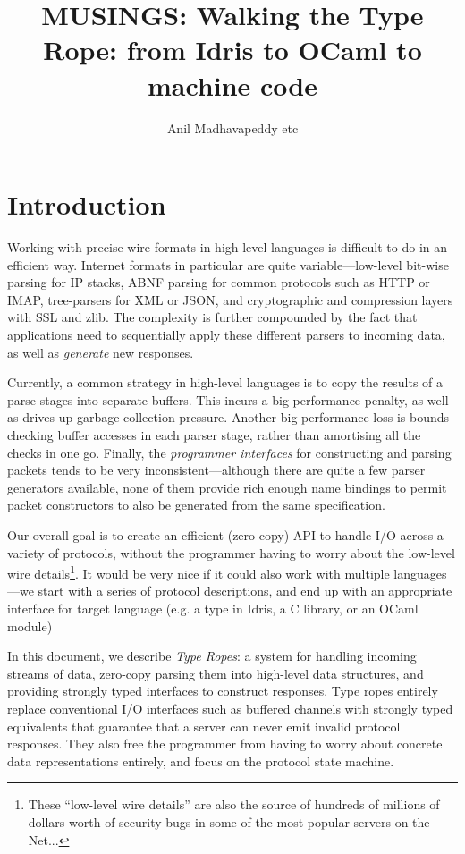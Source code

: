 \documentclass{article}
\begin{document}
\title{MUSINGS: Walking the Type Rope: from Idris to OCaml to machine code}
\author{Anil Madhavapeddy etc}

\maketitle

\section{Introduction}

Working with precise wire formats in high-level languages is difficult to do in an efficient way.
Internet formats in particular are quite variable---low-level bit-wise parsing for IP stacks, ABNF parsing for common protocols such as HTTP or IMAP, tree-parsers for XML or JSON, and cryptographic and compression layers with SSL and zlib.
The complexity is further compounded by the fact that applications need to sequentially apply these different parsers to incoming data, as well as {\em generate} new responses.

Currently, a common strategy in high-level languages is to copy the results of a parse stages into separate buffers. This incurs a big performance penalty, as well as drives up garbage collection pressure.
Another big performance loss is bounds checking buffer accesses in each parser stage, rather than amortising all the checks in one go.
Finally, the {\em programmer interfaces} for constructing and parsing packets tends to be very inconsistent---although there are quite a few parser generators available, none of them provide rich enough name bindings to permit packet constructors to also be generated from the same specification.

Our overall goal is to create an efficient (zero-copy) API to handle I/O across a variety of protocols, without the programmer having to worry about the low-level wire details\footnote{These ``low-level wire details'' are also the source of hundreds of millions of dollars worth of security bugs in some of the most popular servers on the Net...}.  It would be very nice if it could also work with multiple languages---we start with a series of protocol descriptions, and end up with an appropriate interface for target language (e.g. a type in Idris, a C library, or an OCaml module)

In this document, we describe {\em Type Ropes}: a system for handling incoming streams of data, zero-copy parsing them into high-level data structures, and providing strongly typed interfaces to construct responses.  Type ropes entirely replace conventional I/O interfaces such as buffered channels with strongly typed equivalents that guarantee that a server can never emit invalid protocol responses.  They also free the programmer from having to worry about concrete data representations entirely, and focus on the protocol state machine.
\end{document}
